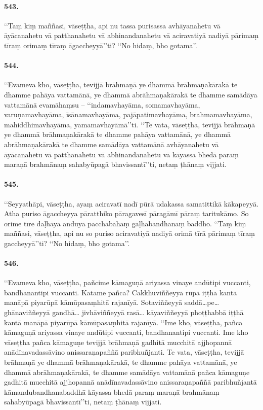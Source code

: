 \paragraph{543.} ‘‘Taṃ kiṃ maññasi, vāseṭṭha, api nu tassa purisassa avhāyanahetu vā āyācanahetu vā patthanahetu vā abhinandanahetu vā aciravatiyā nadiyā pārimaṃ tīraṃ orimaṃ tīraṃ āgaccheyyā’’ti? ‘‘No hidaṃ, bho gotama’’.

\paragraph{544.} ‘‘Evameva kho, vāseṭṭha, tevijjā brāhmaṇā ye dhammā brāhmaṇakārakā te dhamme pahāya vattamānā, ye dhammā abrāhmaṇakārakā te dhamme samādāya vattamānā evamāhaṃsu – ‘‘indamavhayāma, somamavhayāma, varuṇamavhayāma, īsānamavhayāma, pajāpatimavhayāma, brahmamavhayāma, mahiddhimavhayāma, yamamavhayāmā’’ti. ‘‘Te vata, vāseṭṭha, tevijjā brāhmaṇā ye dhammā brāhmaṇakārakā te dhamme pahāya vattamānā, ye dhammā abrāhmaṇakārakā te dhamme samādāya vattamānā avhāyanahetu vā āyācanahetu vā patthanahetu vā abhinandanahetu vā kāyassa bhedā paraṃ maraṇā brahmānaṃ sahabyūpagā bhavissantī’’ti, netaṃ ṭhānaṃ vijjati.

\paragraph{545.} ‘‘Seyyathāpi, vāseṭṭha, ayaṃ aciravatī nadī pūrā udakassa samatittikā kākapeyyā. Atha puriso āgaccheyya pāratthiko pāragavesī pāragāmī pāraṃ taritukāmo. So orime tīre daḷhāya anduyā pacchābāhaṃ gāḷhabandhanaṃ baddho. ‘‘Taṃ kiṃ maññasi, vāseṭṭha, api nu so puriso aciravatiyā nadiyā orimā tīrā pārimaṃ tīraṃ gaccheyyā’’ti? ‘‘No hidaṃ, bho gotama’’.

\paragraph{546.} ‘‘Evameva kho, vāseṭṭha, pañcime kāmaguṇā ariyassa vinaye andūtipi vuccanti, bandhanantipi vuccanti. Katame pañca? Cakkhuviññeyyā rūpā iṭṭhā kantā manāpā piyarūpā kāmūpasaṃhitā rajanīyā. Sotaviññeyyā saddā…pe… ghānaviññeyyā gandhā… jivhāviññeyyā rasā… kāyaviññeyyā phoṭṭhabbā iṭṭhā kantā manāpā piyarūpā kāmūpasaṃhitā rajanīyā. ‘‘Ime kho, vāseṭṭha, pañca kāmaguṇā ariyassa vinaye andūtipi vuccanti, bandhanantipi vuccanti. Ime kho vāseṭṭha pañca kāmaguṇe tevijjā brāhmaṇā gadhitā mucchitā ajjhopannā anādīnavadassāvino anissaraṇapaññā paribhuñjanti. Te vata, vāseṭṭha, tevijjā brāhmaṇā ye dhammā brāhmaṇakārakā, te dhamme pahāya vattamānā, ye dhammā abrāhmaṇakārakā, te dhamme samādāya vattamānā pañca kāmaguṇe gadhitā mucchitā ajjhopannā anādīnavadassāvino anissaraṇapaññā paribhuñjantā kāmandubandhanabaddhā kāyassa bhedā paraṃ maraṇā brahmānaṃ sahabyūpagā bhavissantī’’ti, netaṃ ṭhānaṃ vijjati.

